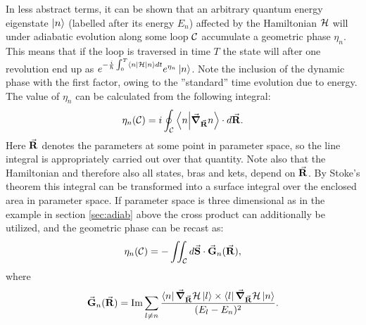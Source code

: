 \documentclass[main.tex]{subfiles}
\begin{document}
In less abstract terms, it can be shown that an arbitrary quantum energy eigenstate \(\ket{n}\)
(labelled after its energy \(E_n\)) affected by the Hamiltonian \(\mathbb{\cal H}\) will under adiabatic evolution along some loop
\(\mathbb{\cal C}\) accumulate a geometric phase \(\eta_n\). This means that if the loop is
traversed in time \(T\) the state will after one revolution end up as
\(e^{-\frac{i}{\hbar{}}\int_0^T \bra{n}\mathbb{\cal H}\ket{n} dt} e^{\eta_n}\ket{n}\). Note
the inclusion of the dynamic phase with the first factor, owing to the ''standard'' time
evolution due to energy. The
value of \(\eta_n\) can be calculated from the following
integral\cite{berry1984}:
\begin{align}\label{eq:etaline}
        \eta_n(\mathbb{\cal C}) = i\oint_{\mathbb{\cal C}}
        \bra{n}\ket{\grad_{\va{R}}n}\cdot  d \va{R}
.\end{align}
Here \(\va{R}\) denotes the parameters at some point in parameter space, so the line integral is
appropriately carried out over that quantity. Note also that the Hamiltonian and therefore
also all states, bras and kets, depend on \(\va{R}\). By Stoke's theorem this integral can be
transformed into a surface integral over the enclosed area in parameter space. If parameter
space is three dimensional as in the example in section \ref{sec:adiab} above the cross product can additionally be
utilized, and the geometric phase can be recast as:
\begin{align}\label{eq:etasurf}
        \eta_n(\mathbb{\cal C}) = -\iint_{\mathbb{\cal
        C}}d \va{S} \cdot \va{G}_n(\va{R})
,\end{align}
where
\begin{align}\label{eq:synmag}
        \va{G}_n(\va{R}) = \Im \sum_{l \ne n}
        \frac{\bra{n}\grad_{\va{R}}\mathbb{\cal H}\ket{l}\times
                \bra{l}\grad_{\va{R}}\mathbb{\cal H}\ket{n}}{(E_l -
                        E_n)^{2}}
.\end{align}
\end{document}

